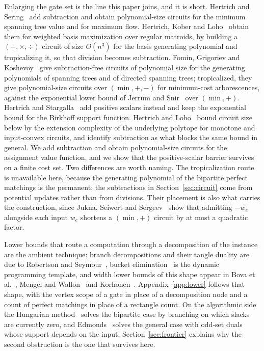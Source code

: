 \documentclass[11pt]{article}
\begin{document}
Enlarging the gate set is the line this paper joins, and it is short.  Hertrich
and Sering~\cite{hertrich-sering25} add subtraction and obtain polynomial-size
circuits for the minimum spanning tree value and for maximum flow.  Hertrich,
Kober and Loho~\cite{hertrich-kober-loho26} obtain them for weighted basis
maximization over regular matroids, by building a $(+,\times,\div)$ circuit of
size $O(n^{3})$ for the basis generating polynomial and tropicalizing it, so that
division becomes subtraction.  Fomin, Grigoriev and Koshevoy~\cite{fgk16} give
subtraction-free circuits of polynomial size for the generating polynomials of
spanning trees and of directed spanning trees; tropicalized, they give
polynomial-size circuits over $(\min,+,-)$ for minimum-cost arborescences,
against the exponential lower bound of Jerrum and Snir~\cite{jerrum-snir82} over
$(\min,+)$.  Hertrich and
Stargalla~\cite{hertrich-stargalla26} add positive scalars instead and keep the
exponential bound for the Birkhoff support function.  Hertrich and
Loho~\cite{hertrich-loho26} bound circuit size below by the extension complexity
of the underlying polytope for monotone and input-convex circuits, and identify
subtraction as what blocks the same bound in general.  We add subtraction and
obtain polynomial-size circuits for the assignment value function, and we show
that the positive-scalar barrier survives on a finite cost set.  Two differences
are worth naming.  The tropicalization route is unavailable here, because the
generating polynomial of the bipartite perfect matchings is the permanent; the
subtractions in Section~\ref{sec:circuit} come from potential updates rather than
from divisions.  Their placement is also what carries the construction, since
Jukna, Seiwert and Sergeev~\cite{jukna-seiwert-sergeev20} show that admitting
$-w_e$ alongside each input $w_e$ shortens a $(\min,+)$ circuit by at most a
quadratic factor.

Lower bounds that route a computation through a decomposition of the instance are
the ambient technique: branch decompositions and their tangle duality are due to
Robertson and Seymour~\cite{robertson-seymour91}, bucket
elimination~\cite{dechter-bucket} is the dynamic programming template, and width
lower bounds of this shape appear in Bova et al.~\cite{bova16-kc}, Mengel and
Wallon~\cite{mengel-wallon20} and Korhonen~\cite{korhonen21-mwis}.
Appendix~\ref{app:lower} follows that shape, with the vertex scope of a gate in
place of a decomposition node and a count of perfect matchings in place of a
rectangle count.  On the algorithmic side the Hungarian method~\cite{kuhn55}
solves the bipartite case by branching on which slacks are currently zero, and
Edmonds~\cite{edmonds65} solves the general case with odd-set duals whose support
depends on the input; Section~\ref{sec:frontier} explains why the second
obstruction is the one that survives here.
\end{document}
